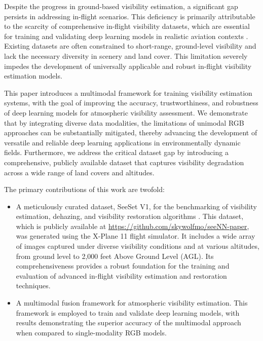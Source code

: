 Despite the progress in ground-based visibility estimation, a significant gap persists in addressing in-flight scenarios. This deficiency is primarily attributable to the scarcity of comprehensive in-flight visibility datasets, which are essential for training and validating deep learning models in realistic aviation contexts \cite{AitOuadil2023}. Existing datasets are often constrained to short-range, ground-level visibility and lack the necessary diversity in scenery and land cover. This limitation severely impedes the development of universally applicable and robust in-flight visibility estimation models.

This paper introduces a multimodal framework for training visibility estimation systems, with the goal of improving the accuracy, trustworthiness, and robustness of deep learning models for atmospheric visibility assessment. We demonstrate that by integrating diverse data modalities, the limitations of unimodal RGB approaches can be substantially mitigated, thereby advancing the development of versatile and reliable deep learning applications in environmentally dynamic fields. Furthermore, we address the critical dataset gap by introducing a comprehensive, publicly available dataset that captures visibility degradation across a wide range of land covers and altitudes.

The primary contributions of this work are twofold:
\begin{itemize}
    \item A meticulously curated dataset, SeeSet V1, for the benchmarking of visibility estimation, dehazing, and visibility restoration algorithms \cite{gui2023comprehensive}. This dataset, which is publicly available at \url{https://github.com/skywolfmo/seeNN-paper}, was generated using the X-Plane 11 flight simulator. It includes a wide array of images captured under diverse visibility conditions and at various altitudes, from ground level to 2,000 feet Above Ground Level (AGL). Its comprehensiveness provides a robust foundation for the training and evaluation of advanced in-flight visibility estimation and restoration techniques.
    

    \item A multimodal fusion framework for atmospheric visibility estimation. This framework is employed to train and validate deep learning models, with results demonstrating the superior accuracy of the multimodal approach when compared to single-modality RGB models.
\end{itemize}

